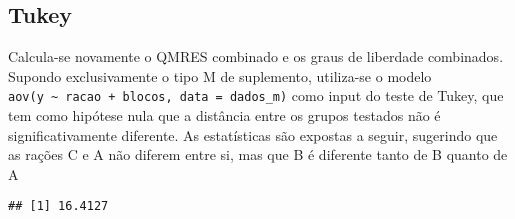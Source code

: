 \documentclass[
]{article}
\newenvironment{Shaded}{\begin{snugshade}}{\end{snugshade}}
\newcommand{\CommentTok}[1]{\textcolor[rgb]{0.56,0.35,0.01}{\textit{#1}}}
\newcommand{\DecValTok}[1]{\textcolor[rgb]{0.00,0.00,0.81}{#1}}
\newcommand{\FunctionTok}[1]{\textcolor[rgb]{0.00,0.00,0.00}{#1}}
\newcommand{\NormalTok}[1]{#1}
\newcommand{\OtherTok}[1]{\textcolor[rgb]{0.56,0.35,0.01}{#1}}
\newcommand{\SpecialCharTok}[1]{\textcolor[rgb]{0.00,0.00,0.00}{#1}}
\begin{document}
\hypertarget{tukey}{%
\subsection{Tukey}\label{tukey}}

Calcula-se novamente o QMRES combinado e os graus de liberdade
combinados. Supondo exclusivamente o tipo M de suplemento, utiliza-se o
modelo
\texttt{aov(y\ \textasciitilde{}\ racao\ +\ blocos,\ data\ =\ dados\_m)}
como input do teste de Tukey, que tem como hipótese nula que a distância
entre os grupos testados não é significativamente diferente. As
estatísticas são expostas a seguir, sugerindo que as rações C e A não
diferem entre si, mas que B é diferente tanto de B quanto de A

\begin{Shaded}
\end{Shaded}

\begin{verbatim}
## [1] 16.4127
\end{verbatim}
\end{document}
